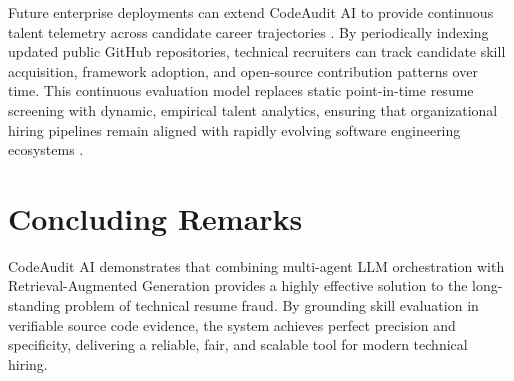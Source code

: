 Future enterprise deployments can extend CodeAudit AI to provide continuous talent telemetry across candidate career trajectories \cite{ref15, ref24}. By periodically indexing updated public GitHub repositories, technical recruiters can track candidate skill acquisition, framework adoption, and open-source contribution patterns over time. This continuous evaluation model replaces static point-in-time resume screening with dynamic, empirical talent analytics, ensuring that organizational hiring pipelines remain aligned with rapidly evolving software engineering ecosystems \cite{ref6, ref25, ref36}.

\section{Concluding Remarks}

CodeAudit AI demonstrates that combining multi-agent LLM orchestration with Retrieval-Augmented Generation provides a highly effective solution to the long-standing problem of technical resume fraud. By grounding skill evaluation in verifiable source code evidence, the system achieves perfect precision and specificity, delivering a reliable, fair, and scalable tool for modern technical hiring.